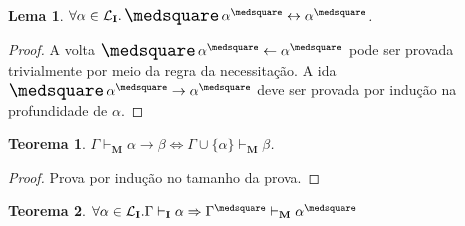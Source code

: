 \documentclass{report}
\newtheorem{lemma}{Lema}
\newtheorem{theorem}{Teorema}
\begin{document}
    \begin{lemma}
        $\forall \alpha \in \mathcal{L}_\mathbf{I} . \nec\alpha^\medsquare \leftrightarrow \alpha^\medsquare$.
    \end{lemma}

    \begin{proof}
        A volta $\nec\alpha^\medsquare\leftarrow\alpha^\medsquare$ pode ser provada trivialmente por meio da regra da necessitação. A ida $\nec\alpha^\medsquare\rightarrow\alpha^\medsquare$ deve ser provada por indução na profundidade de $\alpha$.
    \end{proof}

    \begin{theorem}
        $\Gamma\vdash_\mathbf{M}\alpha\to\beta\Leftrightarrow\Gamma\cup\{\alpha\}\vdash_\mathbf{M}\beta$.
    \end{theorem}

    \begin{proof}
        Prova por indução no tamanho da prova.
    \end{proof}

    \begin{theorem}
        $\forall \alpha \in \mathcal{L}_\mathbf{I} . \Gamma \vdash_\mathbf{I} \alpha \Rightarrow \Gamma^\medsquare \vdash_\mathbf{M} \alpha^\medsquare$
    \end{theorem}
\end{document}
